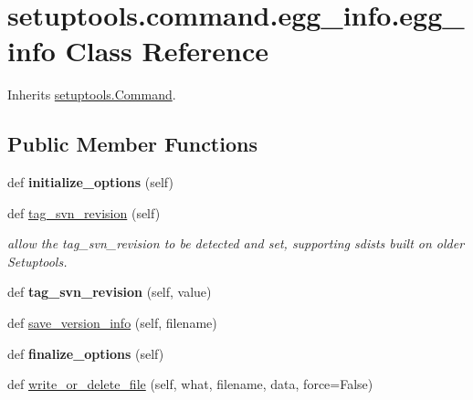 \hypertarget{classsetuptools_1_1command_1_1egg__info_1_1egg__info}{}\section{setuptools.\+command.\+egg\+\_\+info.\+egg\+\_\+info Class Reference}
\label{classsetuptools_1_1command_1_1egg__info_1_1egg__info}


Inherits \hyperlink{classsetuptools_1_1_command}{setuptools.\+Command}.

\subsection*{Public Member Functions}
\begin{DoxyCompactItemize}
\item 
\mbox{\label{classsetuptools_1_1command_1_1egg__info_1_1egg__info_af10eb67dccf35e8622926eeeaa471232}} 
def {\bfseries initialize\+\_\+options} (self)
\item 
def \hyperlink{classsetuptools_1_1command_1_1egg__info_1_1egg__info_a61a0f30d01ed01debb3448ea1e48208f}{tag\+\_\+svn\+\_\+revision} (self)
\begin{DoxyCompactList}\small\item\em allow the \textquotesingle{}tag\+\_\+svn\+\_\+revision\textquotesingle{} to be detected and set, supporting sdists built on older Setuptools. \end{DoxyCompactList}\item 
\mbox{\label{classsetuptools_1_1command_1_1egg__info_1_1egg__info_abac68b6e4edec08133adc83337b60b4e}} 
def {\bfseries tag\+\_\+svn\+\_\+revision} (self, value)
\item 
def \hyperlink{classsetuptools_1_1command_1_1egg__info_1_1egg__info_aff24c2a57934f3ea7ff9a14d0cacf6bd}{save\+\_\+version\+\_\+info} (self, filename)
\item 
\mbox{\label{classsetuptools_1_1command_1_1egg__info_1_1egg__info_ab62dc812cd7873e55721c014fcf3207f}} 
def {\bfseries finalize\+\_\+options} (self)
\item 
def \hyperlink{classsetuptools_1_1command_1_1egg__info_1_1egg__info_af70ce31ed5b38118ad41b3899f56f9b8}{write\+\_\+or\+\_\+delete\+\_\+file} (self, what, filename, data, force=False)

\end{DoxyCompactItemize}
